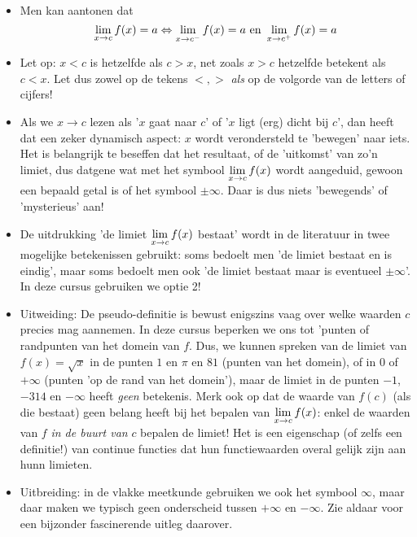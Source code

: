 \documentclass{ximera}
\begin{document}
\begin{remark} \ 

\begin{itemize}	
\item Men kan aantonen dat 
$$
	\limxc  f(x) = a \iff 	\llimxc  f(x) = a \text{ en } 	\rlimxc  f(x) = a
$$
\item Let op: $x<c$ is hetzelfde als  $c>x$, net zoals  $x>c$ hetzelfde betekent als $c<x$. Let dus zowel op de tekens $<,>$ \textit{als} op de volgorde van de letters of cijfers!  

\item Als we  $x\to c$ lezen als '$x$ gaat naar $c$' of '$x$ ligt (erg) dicht bij $c$', dan heeft dat een zeker dynamisch aspect: $x$ wordt verondersteld te 'bewegen' naar iets. Het is belangrijk te beseffen dat het resultaat, of de 'uitkomst' van zo'n limiet, dus datgene wat met het symbool $\limxc f(x)$ wordt aangeduid, gewoon een bepaald getal is of het symbool $\pm\infty$. Daar is dus niets 'bewegends' of 'mysterieus' aan!

\item De uitdrukking 'de limiet $\limxc f(x)$ bestaat' wordt in de literatuur in twee mogelijke betekenissen gebruikt: soms bedoelt men 'de limiet bestaat en is eindig', maar soms bedoelt men ook 'de limiet bestaat maar is eventueel $\pm\infty$'. In deze cursus gebruiken we optie 2! 

\item Uitweiding: De pseudo-definitie is bewust enigszins vaag over welke waarden $c$ precies mag aannemen. In deze cursus beperken we ons tot 'punten of randpunten van het domein van $f$. Dus, we kunnen spreken van de limiet van $f(x)=\sqrt{x}$ in de punten $1$ en $\pi$ en $81$ (punten van het domein), of in $0$ of $+\infty$ (punten 'op de rand van het domein'), maar de limiet in de punten $-1$, $-314$ en $-\infty$ heeft \textit{geen} betekenis. Merk ook op dat de waarde van $f(c)$ (als die bestaat) geen belang heeft bij het bepalen van $\limxg{c}f(x)$: enkel de waarden van $f$ \textit{in de buurt van} $c$ bepalen de limiet! Het is een eigenschap (of zelfs een definitie!) van continue functies dat hun functiewaarden overal gelijk zijn aan hunn limieten.

\item Uitbreiding: in de vlakke meetkunde gebruiken we ook het symbool $\infty$, maar daar maken we typisch geen onderscheid tussen $+\infty$ en $-\infty$. Zie aldaar voor een bijzonder fascinerende uitleg daarover.

\end{itemize}

\end{remark}
\end{document}
